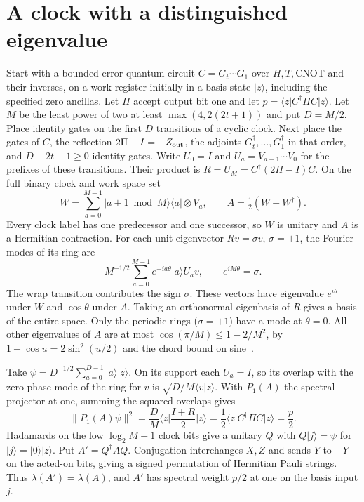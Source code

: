 \documentclass[11pt]{article}
\newcommand{\ket}[1]{\lvert #1\rangle}
\newcommand{\bra}[1]{\langle #1\rvert}
\newcommand{\norm}[1]{\lVert #1\rVert}
\begin{document}
\section{A clock with a distinguished eigenvalue}
Start with a bounded-error quantum circuit \(C=G_t\cdots G_1\) over \(H,T,\mathrm{CNOT}\) and their inverses, on a work register initially in a basis state \(\ket z\), including the specified zero ancillas. Let \(\Pi\) accept output bit one and let \(p=\bra z C^\dagger\Pi C\ket z\). Let \(M\) be the least power of two at least \(\max(4,2(2t+1))\) and put \(D=M/2\). Place identity gates on the first \(D\) transitions of a cyclic clock. Next place the gates of \(C\), the reflection \(2\Pi-I=-Z_{\rm out}\), the adjoints \(G_t^\dagger,\ldots,G_1^\dagger\) in that order, and \(D-2t-1\ge0\) identity gates. Write \(U_0=I\) and \(U_a=V_{a-1}\cdots V_0\) for the prefixes of these transitions. Their product is \(R=U_M=C^\dagger(2\Pi-I)C\). On the full binary clock and work space set
\[
 W=\sum_{a=0}^{M-1}\ket{a+1\bmod M}\bra a\otimes V_a,\qquad
 A=\tfrac12(W+W^\dagger).
\]
Every clock label has one predecessor and one successor, so \(W\) is unitary and \(A\) is a Hermitian contraction. For each unit eigenvector \(Rv=\sigma v\), \(\sigma=\pm1\), the Fourier modes of its ring are
\[
 M^{-1/2}\sum_{a=0}^{M-1}e^{-ia\theta}\ket a U_a v,\qquad e^{iM\theta}=\sigma .
\]
The wrap transition contributes the sign \(\sigma\). These vectors have eigenvalue \(e^{i\theta}\) under \(W\) and \(\cos\theta\) under \(A\). Taking an orthonormal eigenbasis of \(R\) gives a basis of the entire space. Only the periodic rings (\(\sigma=+1\)) have a mode at \(\theta=0\). All other eigenvalues of \(A\) are at most \(\cos(\pi/M)\le1-2/M^2\), by \(1-\cos u=2\sin^2(u/2)\) and the chord bound on sine~\cite{jw}.

Take \(\psi=D^{-1/2}\sum_{a=0}^{D-1}\ket a\ket z\). On its support each \(U_a=I\), so its overlap with the zero-phase mode of the ring for \(v\) is \(\sqrt{D/M}\langle v|z\rangle\). With \(P_1(A)\) the spectral projector at one, summing the squared overlaps gives
\[
 \norm{P_1(A)\psi}^2=\frac{D}{M}\bra z\frac{I+R}{2}\ket z
 =\frac12\bra z C^\dagger\Pi C\ket z=\frac p2 .
\]
Hadamards on the low \(\log_2 M-1\) clock bits give a unitary \(Q\) with \(Q\ket j=\psi\) for \(\ket j=\ket0\ket z\). Put \(A'=Q^\dagger A Q\). Conjugation interchanges \(X,Z\) and sends \(Y\) to \(-Y\) on the acted-on bits, giving a signed permutation of Hermitian Pauli strings. Thus \(\lambda(A')=\lambda(A)\), and \(A'\) has spectral weight \(p/2\) at one on the basis input \(j\).
\end{document}
